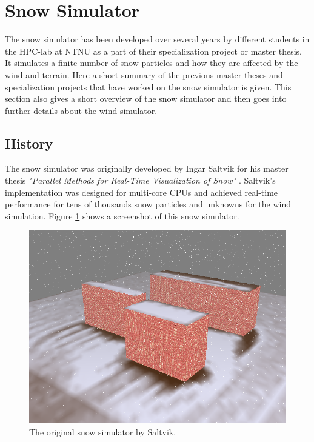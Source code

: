 \section{Snow Simulator}

The snow simulator has been developed over several years by different students in 
the HPC-lab at NTNU as a part of their specialization project or master thesis. 
It simulates a finite number of snow particles and how they are affected by the 
wind and terrain. Here a short summary of the previous master theses and 
specialization projects that have worked on the snow simulator is given. This 
section also gives a short overview of the snow simulator and then goes into 
further details about the wind simulator.

\subsection{History}

The snow simulator was originally developed by Ingar Saltvik for his master
thesis \emph{"Parallel Methods for Real-Time Visualization of Snow"}
\cite{originalSnowThesis}. Saltvik's implementation was designed for multi-core
CPUs and achieved real-time performance for tens of thousands snow particles
and unknowns for the wind simulation. Figure \ref{fig:originalSnow} shows a 
screenshot of this snow simulator.

\begin{figure}[ht]
	\center
	\includegraphics[width=1.0\textwidth]{images/snow/serial/snow5}
	\caption{The original snow simulator by Saltvik.}
	\label{fig:originalSnow}
\end{figure}

